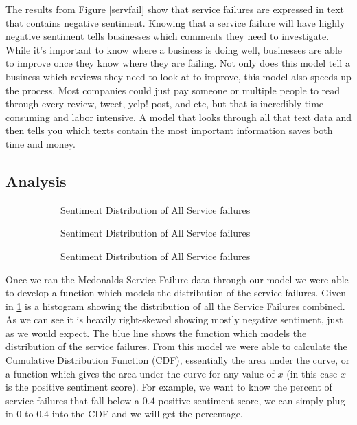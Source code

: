 \documentclass[titlepage,letterpaper]{article}
\begin{document}
The results from Figure \ref{servfail} show that service failures are expressed in text that contains negative sentiment. Knowing that a service failure will have highly negative sentiment tells businesses which comments they need to investigate. While it's important to know where a business is doing well, businesses are able to improve once they know where they are failing. Not only does this model tell a business which reviews they need to look at to improve, this model also speeds up the process. Most companies could just pay someone or multiple people to read through every review, tweet, yelp! post, and etc, but that is incredibly time consuming and labor intensive. A model that looks through all that text data and then tells you which texts contain the most important information saves both time and money.  






\subsection{Analysis}


\begin{figure}[]
	\vspace*{-1.5in}
		\begin{adjustwidth*}{-1in}{-1in}
\begin{subfigure}{16cm}

\caption{Sentiment Distribution of All Service failures}
\label{all}
\end{subfigure}

\begin{subfigure}{16cm}
		\label{sentivfail}
		
		\caption{Sentiment Distribution of All Service failures}
\end{subfigure}

\begin{subfigure}{16cm}
		\label{sentichick}
		
		\caption{Sentiment Distribution of All Service failures}
\end{subfigure}
	\end{adjustwidth*}
	\caption{ }\label{filler}
\end{figure}


Once we ran the Mcdonalds Service Failure data through our model we were able to develop a function which models the distribution of the service failures. Given in \cref{all} is a histogram showing the distribution of all the Service Failures combined. As we can see it is heavily right-skewed showing mostly negative sentiment, just as we would expect. The blue line shows the function which models the distribution of the service failures. From this model we were able to calculate the Cumulative Distribution Function (CDF), essentially the area under the curve, or a function which gives the area under the curve for any value of $x$ (in this case $x$ is the positive sentiment score). For example, we want to know the percent of service failures that fall below a $0.4$ positive sentiment score, we can simply plug in $0$ to $0.4$ into the CDF and we will get the percentage.
\end{document}
